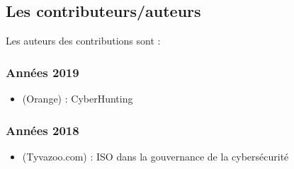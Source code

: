 
\subsection{Les contributeurs/auteurs}

Les auteurs des contributions sont :

\subsubsection{Années 2019}

\begin{itemize}
  \item {} (Orange) : CyberHunting
\end{itemize}


\subsubsection{Années 2018}

\begin{itemize}
  \item {} (Tyvazoo.com) : ISO dans la gouvernance de la cybersécurité
\end{itemize}

